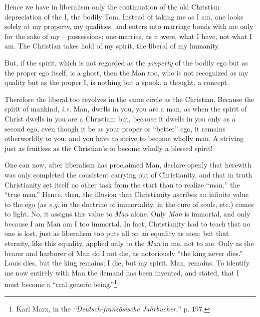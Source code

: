 \documentclass[12pt,a4paper]{book}
\begin{document}
Hence we have in liberalism only the continuation of the old Christian 
depreciation of the I, the bodily Tom. Instead of taking me as I am, one looks 
solely at my property, my qualities, and enters into marriage bonds with me 
only for the sake of my -- possessions; one marries, as it were, what I have, 
not what I am. The Christian takes hold of my spirit, the liberal of my 
humanity.

But, if the spirit, which is not regarded as the \textit{property} of the 
bodily ego but as the proper ego itself, is a ghost, then the Man too, who is 
not recognized as my quality but as the proper I, is nothing but a spook, a 
thought, a concept.

Therefore the liberal too revolves in the same circle as the Christian. 
Because the spirit of mankind, \textit{i.e.} Man, dwells in you, you are a 
man, as when the spirit of Christ dwells in you are a Christian; but, because 
it dwells in you only as a second ego, even though it be as your proper or 
``better'' ego, it remains otherworldly to you, and you have to strive to 
become wholly man. A striving just as fruitless as the Christian's to become 
wholly a blessed spirit!

One can now, after liberalism has proclaimed Man, declare openly that herewith 
was only completed the consistent carrying out of Christianity, and that in 
truth Christianity set itself no other task from the start than to realize 
``man,'' the ``true man.'' Hence, then, the illusion that Christianity 
ascribes an infinite value to the ego (as \textit{e.g.} in the doctrine of 
immortality, in the cure of souls, etc.) comes to light. No, it assigns this 
value to \textit{Man} alone. Only \textit{Man} is immortal, and only because I 
am Man am I too immortal. In fact, Christianity had to teach that no one is 
lost, just as liberalism too puts all on an equality as men; but that 
eternity, like this equality, applied only to the \textit{Man} in me, not to 
me. Only as the bearer and harborer of Man do I not die, as notoriously ``the 
king never dies.'' Louis dies, but the king remains; I die, but my spirit, 
Man, remains. To identify me now entirely with Man the demand has been 
invented, and stated, that I must become a ``real generic 
being.''\footnote{Karl Marx, in the \textit{``Deutsch-franz\"osische 
Jahrbucher},'' p. 197.}
\end{document}
